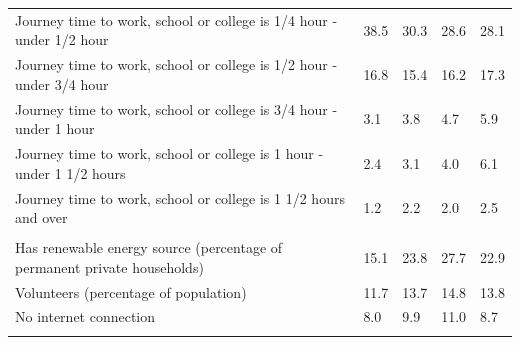 \documentclass{article}
\begin{document}
\begin{table}[h]
\begin{tabular}{KTTTT}
Journey time to work, school or college is 1/4 hour - under 1/2 hour & 38.5& 30.3& 28.6& 28.1\\
Journey time to work, school or college is 1/2 hour - under 3/4 hour & 16.8& 15.4& 16.2& 17.3\\
Journey time to work, school or college is 3/4 hour - under 1 hour & 3.1& 3.8& 4.7& 5.9\\
Journey time to work, school or college is 1 hour - under 1 1/2 hours & 2.4& 3.1& 4.0& 6.1\\
Journey time to work, school or college is 1 1/2 hours and over & 1.2& 2.2& 2.0& 2.5\\
\hline
    \\ 
    \hline
Has renewable energy source (percentage of permanent private households) & 15.1& 23.8& 27.7& 22.9\\
    \hline
Volunteers (percentage of population) & 11.7& 13.7& 14.8& 13.8\\
    \hline
No internet connection&  8.0&  9.9& 11.0&  8.7\\
\hline
\end{tabular}
\end{table}
\end{document}
